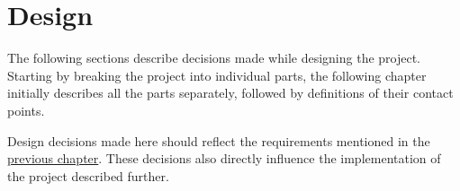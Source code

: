 \chapter{Design}

The following sections describe decisions made while designing the project. 
Starting by breaking the project into individual parts, the following chapter initially describes all the parts separately, followed by definitions of their contact points.

Design decisions made here should reflect the requirements mentioned in the \hyperref[requirements]{previous chapter}.
These decisions also directly influence the implementation of the project described further.








